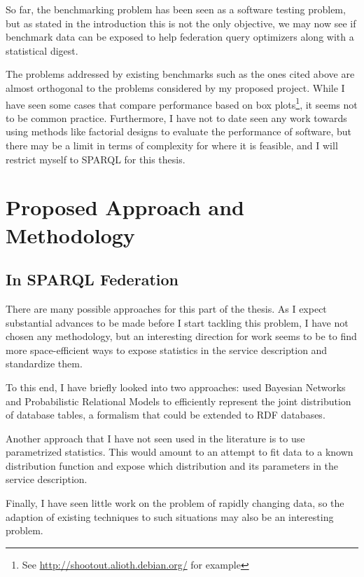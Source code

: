 \documentclass{llncs}
\begin{document}
So far, the benchmarking problem has been seen as a software testing
problem, but as stated in the introduction this is not the only
objective, we may now see if benchmark data can be exposed to help
federation query optimizers along with a statistical digest.

The problems addressed by existing benchmarks such as the ones cited
above are almost orthogonal to the problems considered by my proposed
project. While I have seen some cases that compare performance based
on box plots\footnote{See \url{http://shootout.alioth.debian.org/} for
  example}, it seems not to be common practice. Furthermore, I have not to date seen
any work towards using methods like factorial designs to evaluate
the performance of software, but there may be a limit in terms of
complexity for where it is feasible, and I will restrict myself to
SPARQL for this thesis.



\section{Proposed Approach and Methodology}

\subsection{In SPARQL Federation}

There are many possible approaches for this part of the thesis. As I
expect substantial advances to be made before I start tackling this
problem, I have not chosen any methodology, but an interesting
direction for work seems to be to find more space-efficient ways to
expose statistics in the service description and standardize them.

To this end, I have briefly looked into two approaches:
\cite{Getoor:2001:SEU:375663.375727} used Bayesian Networks and
Probabilistic Relational Models to efficiently represent the joint
distribution of database tables, a formalism that could be extended to
RDF databases.

Another approach that I have not seen used in the literature is to use
parametrized statistics. This would amount to an attempt to fit data to
a known distribution function and expose which distribution and its
parameters in the service description.

Finally, I have seen little work on the problem of rapidly changing
data, so the adaption of existing techniques to such situations may
also be an interesting problem.
\end{document}
